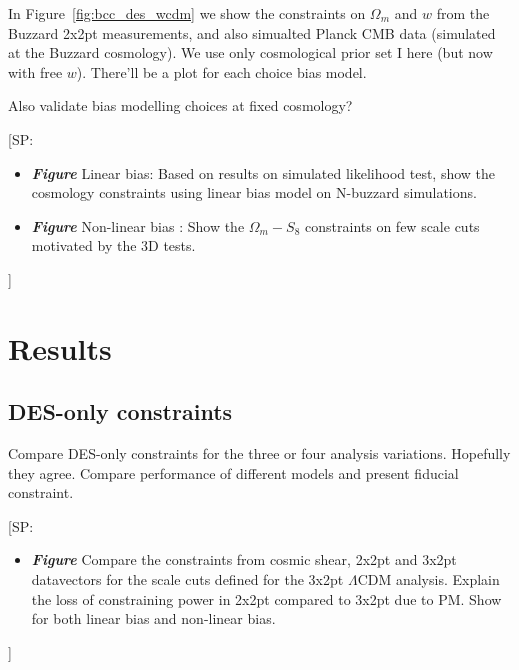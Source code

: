 \documentclass[fleqn,usenatbib]{mnras}
\newcommand\fig[1]{Figure~\ref{#1}}
\newcommand{\SP}[1]{{\color{brown}[SP: #1]}}
\begin{document}
In \fig{fig:bcc_des_wcdm} we show the constraints on $\Omega_m$ and $w$ from the Buzzard 2x2pt measurements, and also simualted Planck CMB data (simulated at the Buzzard cosmology). We use only cosmological prior set I here (but now with free $w$). There'll be a plot for each choice bias model.

Also validate bias modelling choices at fixed cosmology?

\SP{
\begin{itemize}
    \item \textbf{\textit{Figure}} Linear bias: Based on results on simulated likelihood test, show the cosmology constraints using linear bias model on N-buzzard simulations. 
    \item \textbf{\textit{Figure}} Non-linear bias : Show the $\Omega_m - S_8$ constraints on few scale cuts motivated by the 3D tests. 
\end{itemize}
}



\section{Results}

\subsection{DES-only constraints}

Compare DES-only constraints for the three or four analysis variations. Hopefully they agree. Compare performance of different models and present fiducial constraint.

\SP{\begin{itemize}
    \item \textbf{\textit{Figure}} Compare the constraints from cosmic shear, 2x2pt and 3x2pt datavectors for the scale cuts defined for the 3x2pt $\Lambda$CDM analysis. Explain the loss of constraining power in 2x2pt compared to 3x2pt due to PM. Show for both linear bias and non-linear bias. 
\end{itemize}
}
\end{document}

